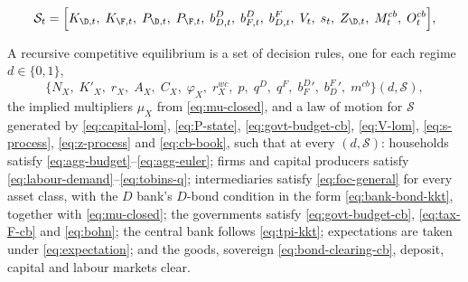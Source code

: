 
\begin{equation}
\mathcal{S}_t=\Bigl[
K_{\D,t},\;K_{\F,t},\;
P_{\D,t},\;P_{\F,t},\;
b^{D}_{D,t},\;b^{D}_{F,t},\;b^{F}_{D,t},\;
V_t,\;s_t,\;Z_{\D,t},\;
M^{cb}_t,\;O^{cb}_t\Bigr],
\label{eq:state}
\end{equation}

\begin{definition}
\label{def:rce}
A recursive competitive equilibrium is a set of decision rules, one for each
regime $d\in\{0,1\}$,
\[
\bigl\{N_X,\;K'_X,\;r_X,\;A_X,\;C_X,\;\varphi_X,\;r^{wc}_X,\;
p,\;q^{D},\;q^{F},\;b^{D}_{F}{}',\;b^{F}_{D}{}',\;m^{cb}\bigr\}(d,\mathcal{S}),
\]
the implied multipliers $\mu_X$ from \eqref{eq:mu-closed}, and a law of motion
for $\mathcal{S}$ generated by \eqref{eq:capital-lom}, \eqref{eq:P-state},
\eqref{eq:govt-budget-cb}, \eqref{eq:V-lom}, \eqref{eq:s-process},
\eqref{eq:z-process} and \eqref{eq:cb-book}, such that at every
$(d,\mathcal{S})$: households satisfy \eqref{eq:agg-budget}--\eqref{eq:agg-euler};
firms and capital producers satisfy \eqref{eq:labour-demand}--\eqref{eq:tobins-q};
intermediaries satisfy \eqref{eq:foc-general} for every asset class, with the
$D$ bank's $D$-bond condition in the form \eqref{eq:bank-bond-kkt}, together with
\eqref{eq:mu-closed}; the governments satisfy \eqref{eq:govt-budget-cb},
\eqref{eq:tax-F-cb} and \eqref{eq:bohn}; the central bank follows
\eqref{eq:tpi-kkt}; expectations are taken under \eqref{eq:expectation}; and the
goods, sovereign \eqref{eq:bond-clearing-cb}, deposit, capital and labour markets
clear.
\end{definition}

